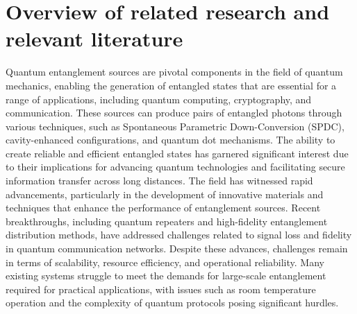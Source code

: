 \documentclass{article}
\theoremstyle{mytheoremstyle}
\theoremstyle{mytheoremstyle}
\theoremstyle{myproblemstyle}
\begin{document}
\section{Overview of related research and relevant literature}
Quantum entanglement sources are pivotal components in the field of quantum mechanics, enabling the generation of entangled states 
that are essential for a range of applications, including quantum computing, cryptography, and communication.
These sources can produce pairs of entangled photons through various techniques, such as Spontaneous Parametric Down-Conversion (SPDC),
cavity-enhanced configurations, and quantum dot mechanisms. The ability to create reliable and efficient entangled states
has garnered significant interest due to their implications for advancing quantum technologies and facilitating secure information transfer 
across long distances.
The field has witnessed rapid advancements, particularly in the development of innovative materials and techniques that enhance the 
performance of entanglement sources. Recent breakthroughs, including quantum repeaters and high-fidelity entanglement distribution methods,
have addressed challenges related to signal loss and fidelity in quantum communication networks.
Despite these advances, challenges remain in terms of scalability, resource efficiency, and operational reliability.
Many existing systems struggle to meet the demands for large-scale entanglement required for practical applications,
with issues such as room temperature operation and the complexity of quantum protocols posing significant hurdles.
\end{document}
